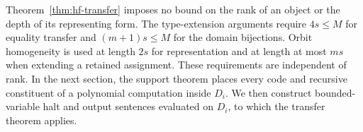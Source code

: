 Theorem~\ref{thm:hf-transfer} imposes no bound on the rank of an object or
the depth of its representing form. The type-extension arguments require
$4s\leq M$ for equality transfer and $(m+1)s\leq M$ for the domain
bijections. Orbit homogeneity is used at length $2s$ for representation
and at length at most $ms$ when extending a retained assignment.
These requirements are independent of rank. In the next section, the
support theorem places every code and recursive constituent of a
polynomial computation inside $D_i$. We then construct bounded-variable
halt and output sentences evaluated on $D_i$, to which the transfer
theorem applies.
